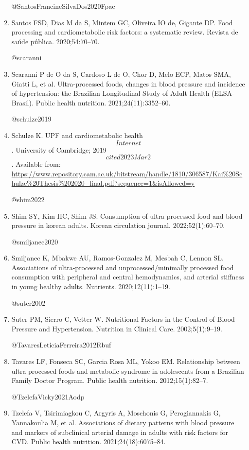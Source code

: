 \documentclass[
]{article}
\begin{document}
\begin{enumerate}
  @SantosFrancineSilvaDos2020Fpac
\item
  Santos FSD, Dias M da S, Mintem GC, Oliveira IO de, Gigante DP. Food
  processing and cardiometabolic risk factors: a systematic review.
  Revista de saúde pública. 2020;54:70--70.

  @scaranni
\item
  Scaranni P de O da S, Cardoso L de O, Chor D, Melo ECP, Matos SMA,
  Giatti L, et al. Ultra-processed foods, changes in blood pressure and
  incidence of hypertension: the Brazilian Longitudinal Study of Adult
  Health (ELSA-Brasil). Public health nutrition. 2021;24(11):3352--60.

  @schulze2019
\item
  Schulze K. UPF and cardiometabolic health \[Internet\]. University of
  Cambridge; 2019 \[cited 2023 Mar 2\]. Available from:
  \url{https://www.repository.cam.ac.uk/bitstream/handle/1810/306587/Kai\%20Schulze\%20Thesis\%202020_final.pdf?sequence=1\&isAllowed=y}

  @shim2022
\item
  Shim SY, Kim HC, Shim JS. Consumption of ultra-processed food and
  blood pressure in korean adults. Korean circulation journal.
  2022;52(1):60--70.

  @smiljanec2020
\item
  Smiljanec K, Mbakwe AU, Ramos-Gonzalez M, Mesbah C, Lennon SL.
  Associations of ultra-processed and unprocessed/minimally processed
  food consumption with peripheral and central hemodynamics, and
  arterial stiffness in young healthy adults. Nutrients.
  2020;12(11):1--19.

  @suter2002
\item
  Suter PM, Sierro C, Vetter W. Nutritional Factors in the Control of
  Blood Pressure and Hypertension. Nutrition in Clinical Care.
  2002;5(1):9--19.

  @TavaresLetíciaFerreira2012Rbuf
\item
  Tavares LF, Fonseca SC, Garcia Rosa ML, Yokoo EM. Relationship between
  ultra-processed foods and metabolic syndrome in adolescents from a
  Brazilian Family Doctor Program. Public health nutrition.
  2012;15(1):82--7.

  @TzelefaVicky2021Aodp
\item
  Tzelefa V, Tsirimiagkou C, Argyris A, Moschonis G, Perogiannakis G,
  Yannakoulia M, et al. Associations of dietary patterns with blood
  pressure and markers of subclinical arterial damage in adults with
  risk factors for CVD. Public health nutrition. 2021;24(18):6075--84.


\end{enumerate}
\end{document}
